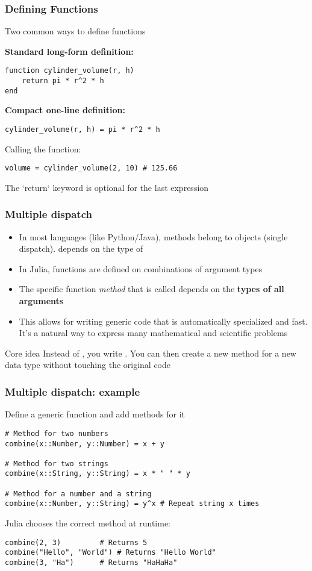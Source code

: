 \documentclass[aspectratio=169]{beamer}\usepackage[]{graphicx}\usepackage[]{xcolor}
\begin{document}
\begin{frame}[fragile]
  \frametitle{Defining Functions}
  Two common ways to define functions
  
  \textbf{Standard long-form definition:}
  \begin{lstlisting}
function cylinder_volume(r, h)
    return pi * r^2 * h
end\end{lstlisting}
  
  \vfill
  \textbf{Compact one-line definition:}
  \begin{lstlisting}
cylinder_volume(r, h) = pi * r^2 * h\end{lstlisting}
  
  \vfill
  Calling the function:
\begin{lstlisting}
volume = cylinder_volume(2, 10) # 125.66\end{lstlisting}
The `return` keyword is optional for the last expression
\end{frame}

\begin{frame}
  \frametitle{Multiple dispatch}
  \begin{itemize}
    \item In most languages (like Python/Java), methods belong to objects (single dispatch).  depends on the type of 
    \vfill
    \item In Julia, functions are defined on combinations of argument types
    \vfill
    \item The specific function \textit{method} that is called depends on the \textbf{types of all arguments}
    \vfill
    \item This allows for writing generic code that is automatically specialized and fast. It's a natural way to express many mathematical and scientific problems
  \end{itemize}
  \vfill
  \begin{exampleblock}{Core idea}
  Instead of , you write . You can then create a new  method for a new data type without touching the original code
  \end{exampleblock}
\end{frame}

\begin{frame}[fragile]
  \frametitle{Multiple dispatch: example}
  Define a generic function  and add methods for it
  \begin{lstlisting}
# Method for two numbers
combine(x::Number, y::Number) = x + y

# Method for two strings
combine(x::String, y::String) = x * " " * y

# Method for a number and a string
combine(x::Number, y::String) = y^x # Repeat string x times\end{lstlisting}
  \vfill
  Julia chooses the correct method at runtime:
  \begin{lstlisting}
combine(2, 3)         # Returns 5
combine("Hello", "World") # Returns "Hello World"
combine(3, "Ha")      # Returns "HaHaHa"\end{lstlisting}
\end{frame}
\end{document}
